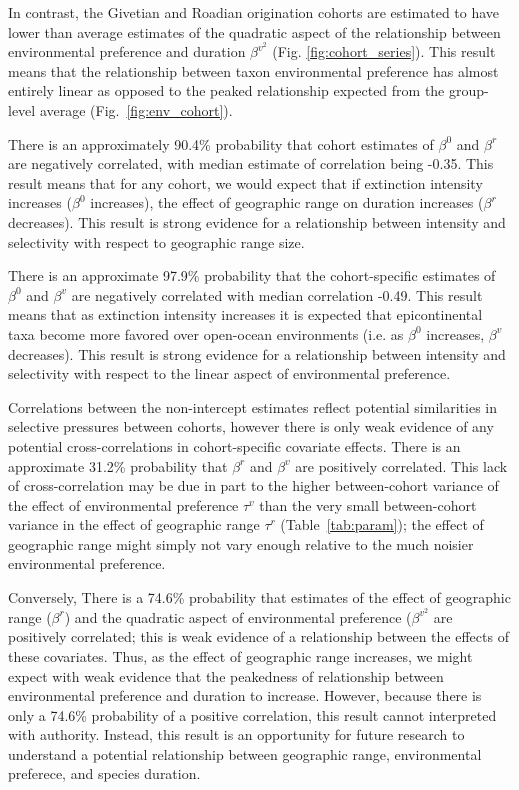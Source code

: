 \documentclass[11pt]{article}
\begin{document}
In contrast, the Givetian and Roadian origination cohorts are estimated to have lower than average estimates of the quadratic aspect of the relationship between environmental preference and duration \(\beta^{v^{2}}\) (Fig. \ref{fig:cohort_series}). This result means that the relationship between taxon environmental preference has almost entirely linear as opposed to the peaked relationship expected from the group-level average (Fig.~\ref{fig:env_cohort}).


There is an approximately 90.4\% probability that cohort estimates of \(\beta^{0}\) and \(\beta^{r}\) are negatively correlated, with median estimate of correlation being -0.35. This result means that for any cohort, we would expect that if extinction intensity increases (\(\beta^{0}\) increases), the effect of geographic range on duration increases (\(\beta^{r}\) decreases). This result is strong evidence for a relationship between intensity and selectivity with respect to geographic range size.

There is an approximate 97.9\% probability that the cohort-specific estimates of \(\beta^{0}\) and \(\beta^{v}\) are negatively correlated with median correlation -0.49. This result means that as extinction intensity increases it is expected that epicontinental taxa become more favored over open-ocean environments (i.e. as \(\beta^{0}\) increases, \(\beta^{v}\) decreases). This result is strong evidence for a relationship between intensity and selectivity with respect to the linear aspect of environmental preference. 

Correlations between the non-intercept estimates reflect potential similarities in selective pressures between cohorts, however there is only weak evidence of any potential cross-correlations in cohort-specific covariate effects. There is an approximate 31.2\% probability that \(\beta^{r}\) and \(\beta^{v}\) are positively correlated. This lack of cross-correlation may be due in part to the higher between-cohort variance of the effect of environmental preference \(\tau^{v}\) than the very small between-cohort variance in the effect of geographic range \(\tau^{r}\) (Table~\ref{tab:param}); the effect of geographic range might simply not vary enough relative to the much noisier environmental preference. 

Conversely, There is a 74.6\% probability that estimates of the effect of geographic range (\(\beta^{r}\)) and the quadratic aspect of environmental preference (\(\beta^{v^{2}}\) are positively correlated; this is weak evidence of a relationship between the effects of these covariates. Thus, as the effect of geographic range increases, we might expect with weak evidence that the peakedness of relationship between environmental preference and duration to increase. However, because there is only a 74.6\% probability of a positive correlation, this result cannot interpreted with authority. Instead, this result is an opportunity for future research to understand a potential relationship between geographic range, environmental preferece, and species duration.
\end{document}
